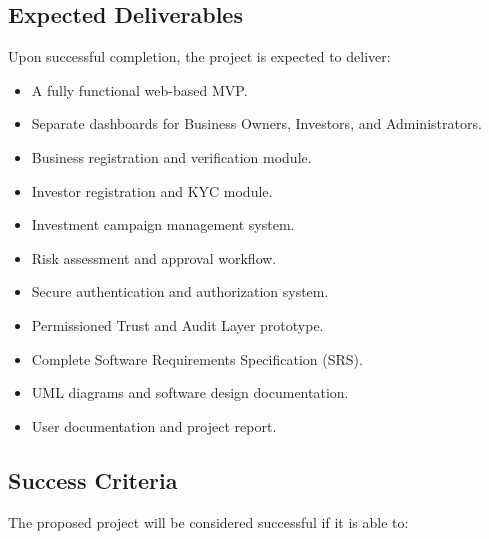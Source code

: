 
\subsection{Expected Deliverables}

Upon successful completion, the project is expected to deliver:

\begin{itemize}

\item A fully functional web-based MVP.

\item Separate dashboards for Business Owners, Investors, and Administrators.

\item Business registration and verification module.

\item Investor registration and KYC module.

\item Investment campaign management system.

\item Risk assessment and approval workflow.

\item Secure authentication and authorization system.

\item Permissioned Trust and Audit Layer prototype.

\item Complete Software Requirements Specification (SRS).

\item UML diagrams and software design documentation.

\item User documentation and project report.

\end{itemize}


\subsection{Success Criteria}

The proposed project will be considered successful if it is able to:

